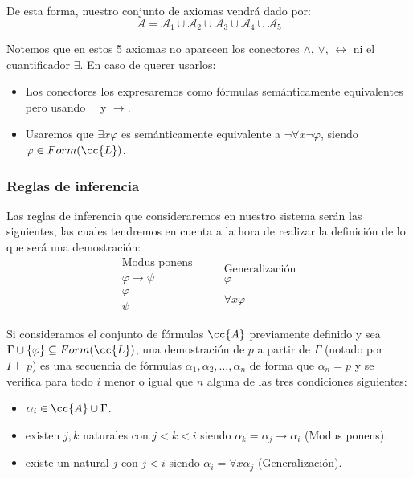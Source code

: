 De esta forma, nuestro conjunto de axiomas vendrá dado por:
\begin{equation*}
    \mathcal{A} = \mathcal{A}_1 \cup \mathcal{A}_2 \cup \mathcal{A}_3 \cup \mathcal{A}_4 \cup \mathcal{A}_5
\end{equation*}

Notemos que en estos 5 axiomas no aparecen los conectores $\land$, $\lor$, $\leftrightarrow $ ni el cuantificador $\exists $. En caso de querer usarlos:
\begin{itemize}
    \item Los conectores los expresaremos como fórmulas semánticamente equivalentes pero usando $\lnot$ y $\to$.
    \item Usaremos que $\exists x\varphi$ es semánticamente equivalente a $\lnot\forall x\lnot\varphi$, siendo $\varphi \in Form(\cc{L})$.
\end{itemize}

\subsubsection{Reglas de inferencia}
Las reglas de inferencia que consideraremos en nuestro sistema serán las siguientes, las cuales tendremos en cuenta a la hora de realizar la definición de lo que será una demostración:
\begin{equation*}
    \begin{array}{l}
        \text{Modus ponens} \\
        \varphi\to \psi \\
        \varphi \\
        \hline
        \psi 
    \end{array} \qquad \begin{array}{l}
        \text{Generalización}\\
        \varphi \\
        \ \\
        \hline
        \forall x\varphi 
    \end{array}
\end{equation*}

\begin{definicion}[Demostración]
    Si consideramos el conjunto de fórmulas $\cc{A}$ previamente definido y sea $\Gamma\cup\{\varphi\} \subseteq Form(\cc{L})$, una demostración de $p$ a partir de $\Gamma$ (notado por $\Gamma\vdash p$) es una secuencia de fórmulas $\alpha_1,\alpha_2,\ldots,\alpha_n$ de forma que $\alpha_n = p$ y se verifica para todo $i$ menor o igual que $n$ alguna de las tres condiciones siguientes:
    \begin{itemize}
        \item $\alpha_i \in \cc{A}\cup \Gamma$.
        \item existen $j,k$ naturales con $j<k<i$ siendo $\alpha_k = \alpha_j \to \alpha_i$ (Modus ponens).
        \item existe un natural $j$ con $j<i$ siendo $\alpha_i = \forall x\alpha_j$ (Generalización).
    \end{itemize}
\end{definicion}

